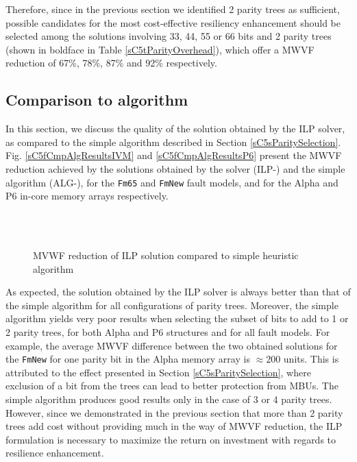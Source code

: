 \documentclass[12pt]{yalephd}
\begin{document}
Therefore, since in the previous section we identified 2 parity trees as sufficient, possible candidates for the most cost-effective resiliency enhancement should be selected among the solutions involving 33, 44, 55 or 66 bits and 2 parity trees (shown in boldface in Table \ref{sC5tParityOverhead}), which offer a MWVF reduction of 67\%, 78\%, 87\% and 92\% respectively.



\subsection{Comparison to algorithm}\label{sC5sComparison}

In this section, we discuss the quality of the solution obtained by the ILP solver, as compared to the simple algorithm described in Section \ref{sC5sParitySelection}. Fig. \ref{sC5fCmpAlgResultsIVM} and \ref{sC5fCmpAlgResultsP6} present the MWVF reduction achieved by the solutions obtained by the solver (ILP-) and the simple algorithm (ALG-), for the {\tt Fm65} and {\tt FmNew} fault models, and for the Alpha and P6 in-core memory arrays respectively.

\begin{figure}[!ht]
    \centering
        \\
         \\
\caption{MVWF reduction of ILP solution compared to simple heuristic algorithm}
\label{fCmpAlgResults}
\end{figure}

As expected, the solution obtained by the ILP solver is always better than that of the simple algorithm for all configurations of parity trees. Moreover, the simple algorithm yields very poor results when selecting the subset of bits to add to 1 or 2 parity trees, for both Alpha and P6 structures and for all fault models. For example, the average MWVF difference between the two obtained solutions for the {\tt FmNew} for one parity bit in the Alpha memory array is $\approx 200$ units. This is attributed to the effect presented in Section \ref{sC5sParitySelection}, where exclusion of a bit from the trees can lead to better protection from MBUs. The simple algorithm produces good results only in the case of 3 or 4 parity trees. However, since we demonstrated in the previous section that more than 2 parity trees add cost without providing much in the way of MWVF reduction, the ILP formulation is necessary to maximize the return on investment with regards to resilience enhancement.
\end{document}
